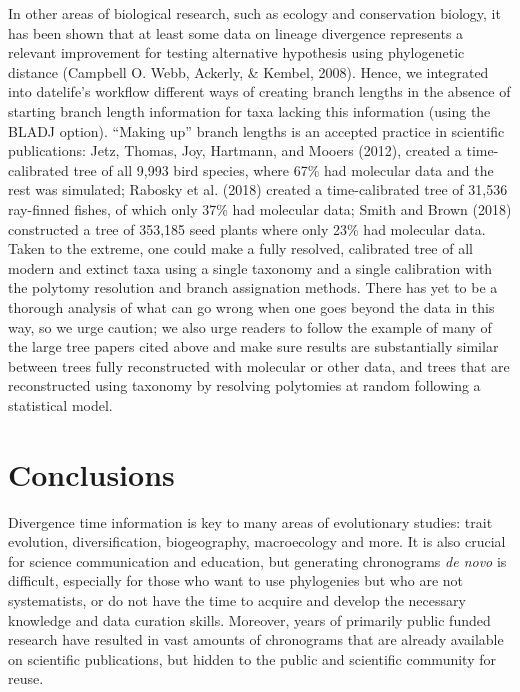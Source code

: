 \documentclass[
  english,
  man]{apa6}
\begin{document}
In other areas of biological research, such as ecology and conservation biology, it has been shown that at least some data on lineage divergence represents a relevant improvement for testing alternative hypothesis using phylogenetic distance (Campbell O. Webb, Ackerly, \& Kembel, 2008). Hence, we integrated into datelife's workflow different ways of creating branch lengths in the absence of starting branch length information for taxa lacking this information (using the BLADJ option). ``Making up'' branch lengths is an accepted practice in scientific publications: Jetz, Thomas, Joy, Hartmann, and Mooers (2012), created a time-calibrated tree of all 9,993 bird species, where 67\% had molecular data and the rest was simulated; Rabosky et al. (2018) created a time-calibrated tree of 31,536 ray-finned fishes, of which only 37\% had molecular data; Smith and Brown (2018) constructed a tree of 353,185 seed plants where only 23\% had molecular data. Taken to the extreme, one could make a fully resolved, calibrated tree of all modern and extinct taxa using a single taxonomy and a single calibration with the polytomy resolution and branch assignation methods. There has yet to be a thorough analysis of what can go wrong when one goes beyond the data in this way, so we urge caution; we also urge readers to follow the example of many of the large tree papers cited above and make sure results are substantially similar between trees fully reconstructed with molecular or other data, and trees that are reconstructed using taxonomy by resolving polytomies at random following a statistical model.

\hypertarget{conclusions}{%
\section{Conclusions}\label{conclusions}}

Divergence time information is key to many areas of evolutionary studies: trait evolution,
diversification, biogeography, macroecology and more. It is also crucial for science communication and education, but generating chronograms \emph{de novo} is difficult,
especially for those who want to use phylogenies but who are not systematists, or
do not have the time to acquire and develop the necessary knowledge and data curation skills. Moreover, years of primarily public funded research have resulted in vast amounts of chronograms that are already available on scientific publications, but hidden to the public and scientific community for reuse.
\end{document}
